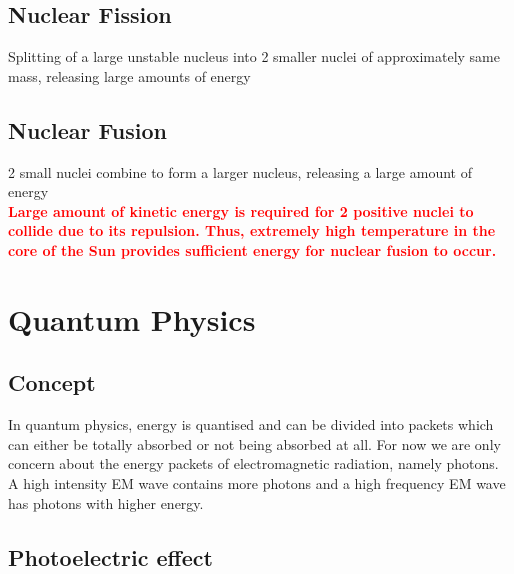 \documentclass{article}
\begin{document}
 
 
 \subsection{Nuclear Fission}

 Splitting of a large unstable nucleus into 2 smaller nuclei of approximately same mass, releasing large amounts of energy
 

\subsection{Nuclear Fusion}
 
 2 small nuclei combine to form a larger nucleus, releasing a large amount of energy
 \\
 
\textcolor{red}{ \textbf{Large amount of kinetic energy is required for 2 positive nuclei to collide due to its repulsion. Thus, extremely high temperature in the core of the Sun provides sufficient energy for nuclear fusion to occur.}}

\newpage 
 \section{Quantum Physics}
 
 
 \subsection{Concept}

 
 In quantum physics, energy is quantised and can be divided into packets which can either be totally absorbed or not being absorbed at all. For now we are only concern about the energy packets of electromagnetic radiation, namely photons. A high intensity EM wave contains more photons and a high frequency EM wave has photons with higher energy.
 
  
 \subsection{Photoelectric effect}
\end{document}
